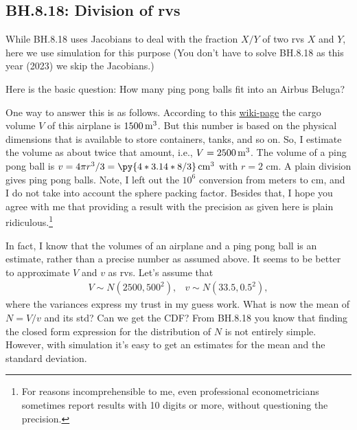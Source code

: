 \subsection{BH.8.18: Division of rvs}





While BH.8.18 uses Jacobians to deal with the fraction $X/Y$ of two rvs $X$ and $Y$, here we use simulation for this purpose
(You don't have to solve BH.8.18 as this year (2023) we skip the Jacobians.)

Here is the basic question: How many ping pong balls fit into an Airbus Beluga?


One way to answer this is as follows.
According to this \href{https://en.wikipedia.org/wiki/Airbus\_Beluga}{wiki-page} the cargo volume $V$ of this airplane is $1500 \,\mathrm{m}^{3}$.
But this number is based on the physical dimensions that is available to store containers, tanks, and so on.
So, I estimate the volume as about twice that amount, i.e., $V = 2500 \,\mathrm{m}^{3}$.
The volume of a ping pong ball is $v = 4 \pi r^3/3  = \py{4*3.14*8/3} \cm^{3}$ with $r=2$ cm.
A plain division gives  ping pong balls.
Note, I left out the $10^{6}$ conversion from meters to cm, and I do not take into  account the sphere packing factor.
Besides that, I hope you agree with me that providing a result with the precision as given here is plain ridiculous.\footnote{For reasons incomprehensible to me, even professional econometricians sometimes  report results with 10 digits or more, without questioning the precision.}


In fact, I know that the volumes of an airplane and a ping pong ball is an estimate, rather than a precise number as assumed above.
It seems to be better to approximate $V$ and $v$ as rvs.
Let's assume that
   \begin{align*}
V \sim N(2500, 500^{2}), & v \sim N(33.5, 0.5^{2}),
\end{align*}
where the variances express my trust in my guess work.
What is now the mean of $N = V/v$ and its std? Can we get the CDF?
From BH.8.18 you know that finding the closed form expression for the distribution of $N$ is not entirely simple.
However, with simulation it's easy to get an estimates for the mean and the standard deviation.


